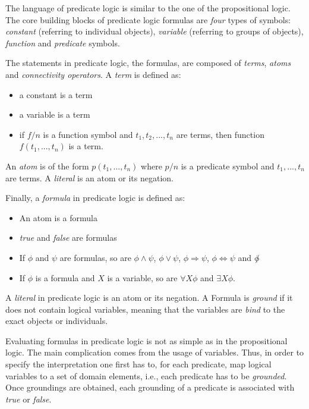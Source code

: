 The language of predicate logic is similar to the one of the propositional logic.
The core building blocks of predicate logic formulas are \textit{four} types of symbols: \textit{constant} (referring to individual objects), \textit{variable} (referring to groups of objects), \textit{function} and \textit{predicate} symbols.


The statements in predicate logic, the formulas, are composed of \textit{terms}, \textit{atoms} and \textit{connectivity operators}.
A \textit{term} is defined as:
\begin{itemize}
	\item a constant is a term
	\item a variable is a term
	\item if $f / n$ is a function symbol and $t_1,t_2,...,t_n$ are terms, then function $f(t_1,...,t_n)$ is a term.
\end{itemize}


An \textit{atom} is of the form $p(t_1,...,t_n)$ where $p/n$ is a predicate symbol and $t_1,...,t_n$ are terms.
A \textit{literal} is an atom or its negation.


Finally, a \textit{formula} in predicate logic is defined as:
\begin{itemize}
	\item An atom is a formula
	\item \textit{true} and \textit{false} are formulas
	\item If $\phi$ and $\psi$ are formulas, so are $\phi \wedge \psi$, $\phi \vee \psi$, $\phi \Rightarrow \psi$, $\phi \Leftrightarrow \psi$ and $\not \phi$
	\item If $\phi$ is a formula and $X$ is a variable, so are $\forall X \phi$ and $\exists X \phi$.
\end{itemize}


A \textit{literal} in predicate logic is an atom or its negation.
A Formula is \textit{ground} if it does not contain logical variables, meaning that the variables are \textit{bind} to the exact objects or individuals.







Evaluating formulas in predicate logic is not as simple as in the propositional logic.
The main complication comes from the usage of variables.
Thus, in order to specify the interpretation one first has to, for each predicate,  map logical variables to a set of domain elements, i.e., each predicate has to be \textit{grounded}.
Once groundings are obtained, each grounding of a predicate is associated with \textit{true} or \textit{false}.



